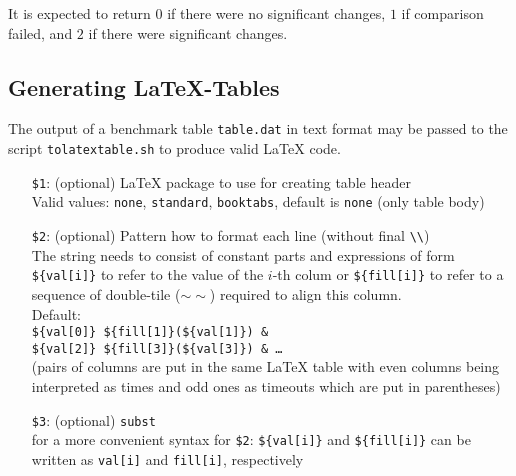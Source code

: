 \documentclass[a4paper]{article}
\begin{document}
			It is expected to return $0$ if there were no significant changes,
			$1$ if comparison failed, and $2$ if there were significant changes.
					
		\subsection{Generating \LaTeX-Tables}
					
			The output of a benchmark table {\tt table.dat} in text format
			may be passed to the script {\tt tolatextable.sh} to produce valid \LaTeX{} code.

			\medskip{}
		    \begin{itemize}
				\item[{\tt \$1}:] (optional) \LaTeX{} package to use for creating table header \\
					Valid values: {\tt none}, {\tt standard}, {\tt booktabs}, default is {\tt none} (only table body)
				\item[{\tt \$2}:] (optional) Pattern how to format each line (without final {\tt \textbackslash\textbackslash}) \\
					The string needs to consist of constant parts and expressions of form
					{\tt \$\{val[i]\}} to refer to the value of the $i$-th colum
					or {\tt \$\{fill[i]\}} to refer to a sequence of double-tile ($\sim\sim$) required to align this column. \\
					Default: \\
					{\tt \$\{val[0]\} \$\{fill[1]\}(\$\{val[1]\}) \& \\
					 \$\{val[2]\} \$\{fill[3]\}(\$\{val[3]\}) \& \ldots} \\
					(pairs of columns are put in the same LaTeX table with even columns being interpreted as times
					and odd ones as timeouts which are put in parentheses)
				\item[{\tt \$3}:] (optional) {\tt subst} \\
					for a more convenient syntax for {\tt \$2}: {\tt \$\{val[i]\}} and {\tt \$\{fill[i]\}} can be written as {\tt val[i]} and {\tt fill[i]}, respectively
		    \end{itemize}
\end{document}
